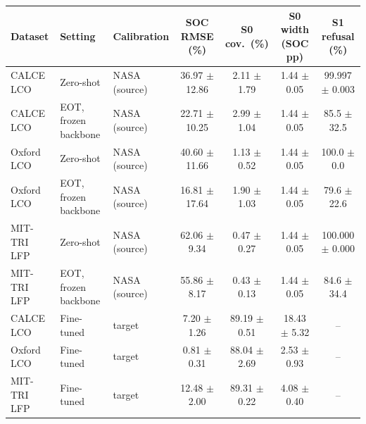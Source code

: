 \begin{tabular}{lllcccc}
\toprule
Dataset & Setting & Calibration & SOC RMSE (\%) & S0 cov.\ (\%) & S0 width (SOC pp) & S1 refusal (\%) \\
\midrule
CALCE LCO & Zero-shot & NASA (source) & 36.97 $\pm$ 12.86 & 2.11 $\pm$ 1.79 & 1.44 $\pm$ 0.05 & 99.997 $\pm$ 0.003 \\
CALCE LCO & EOT, frozen backbone & NASA (source) & 22.71 $\pm$ 10.25 & 2.99 $\pm$ 1.04 & 1.44 $\pm$ 0.05 & 85.5 $\pm$ 32.5 \\
Oxford LCO & Zero-shot & NASA (source) & 40.60 $\pm$ 11.66 & 1.13 $\pm$ 0.52 & 1.44 $\pm$ 0.05 & 100.0 $\pm$ 0.0 \\
Oxford LCO & EOT, frozen backbone & NASA (source) & 16.81 $\pm$ 17.64 & 1.90 $\pm$ 1.03 & 1.44 $\pm$ 0.05 & 79.6 $\pm$ 22.6 \\
MIT-TRI LFP & Zero-shot & NASA (source) & 62.06 $\pm$ 9.34 & 0.47 $\pm$ 0.27 & 1.44 $\pm$ 0.05 & 100.000 $\pm$ 0.000 \\
MIT-TRI LFP & EOT, frozen backbone & NASA (source) & 55.86 $\pm$ 8.17 & 0.43 $\pm$ 0.13 & 1.44 $\pm$ 0.05 & 84.6 $\pm$ 34.4 \\
\midrule
CALCE LCO & Fine-tuned & target & 7.20 $\pm$ 1.26 & 89.19 $\pm$ 0.51 & 18.43 $\pm$ 5.32 & -- \\
Oxford LCO & Fine-tuned & target & 0.81 $\pm$ 0.31 & 88.04 $\pm$ 2.69 & 2.53 $\pm$ 0.93 & -- \\
MIT-TRI LFP & Fine-tuned & target & 12.48 $\pm$ 2.00 & 89.31 $\pm$ 0.22 & 4.08 $\pm$ 0.40 & -- \\
\bottomrule
\end{tabular}
